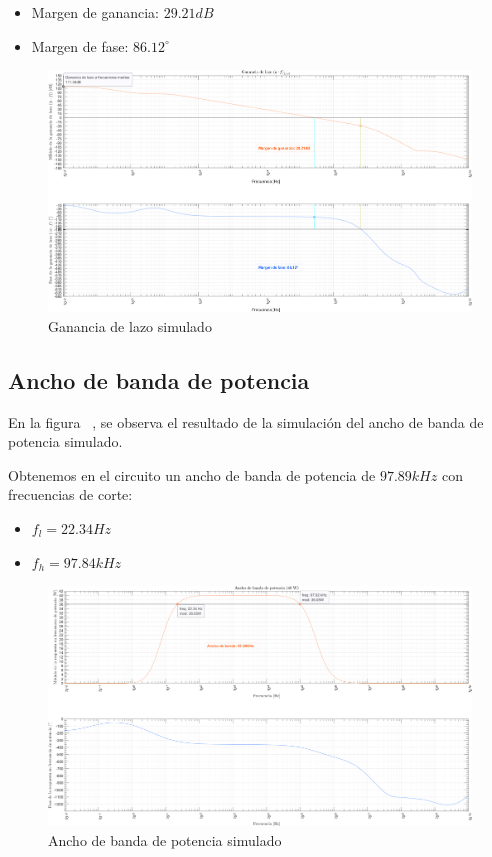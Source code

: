 \begin{itemize}
    \item Margen de ganancia: $29.21dB$
    \item Margen de fase: $86.12^\circ$
\end{itemize}

\begin{figure}[H]
    \centering
    \includegraphics[scale=0.4]{./img/simulaciones/Loop/gain_loop.png}
    \caption{Ganancia de lazo simulado}
    \label{fig:gain_loop_sim}
\end{figure}


\subsection{Ancho de banda de potencia}

\par En la figura ~, se observa el resultado de la simulación del ancho de banda de potencia simulado.
\par Obtenemos en el circuito un ancho de banda de potencia de $97.89kHz$ con frecuencias de corte:

\begin{itemize}
    \item $f_l = 22.34Hz$
    \item $f_h = 97.84kHz$
\end{itemize}

\begin{figure}[H]
    \centering
    \includegraphics[scale=0.4]{./img/simulaciones/BW/Power_BW.png}
    \caption{Ancho de banda de potencia simulado}
    \label{fig:Power_BW_sim}
\end{figure}


